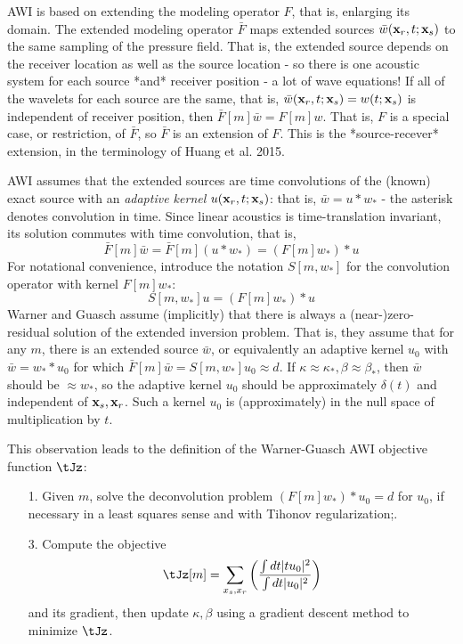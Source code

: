AWI is based on extending the modeling operator $F$, that is, enlarging its domain.
The extended modeling operator ${\bar F}$ maps extended sources $\bar{w}({\bf x}_r,t;{\bf x}_s)$ to the same sampling of the pressure field. That is, the extended source depends on the receiver location as well as the source location - so there is one acoustic system for each source *and* receiver position - a lot of wave equations! If all of the wavelets for each source are the same, that is, ${\bar w}({\bf x}_r,t;{\bf x}_s) = w(t;{\bf x}_s)$ is independent of receiver position, then ${\bar F}[m]\bar{w} = F[m]w$. That is, $F$ is a special case, or restriction, of ${\bar F}$, so ${\bar F}$ is an extension of $F$. This is the *source-recever* extension, in the terminology of Huang et al. 2015. 

AWI assumes that the extended sources are time convolutions of the (known) exact source with an {\em adaptive kernel} $u({\bf x}_r,t;{\bf x}_s)$: that is, $\bar{w} = u * w_*$ - the asterisk denotes convolution in time. Since linear acoustics is time-translation invariant, its solution commutes with time convolution, that is,
$$
\bar{F}[m]\bar{w} = \bar{F}[m](u* w_*) = (F[m]w_*)*u
$$
For notational convenience, introduce the notation $S[m,w_*]$ for the convolution operator with kernel $F[m]w_*$:
\begin{equation}
  \label{eqn:defs}
  S[m,w_*]u = (F[m]w_*)*u
\end{equation}
Warner and Guasch assume (implicitly) that there is always a (near-)zero-residual solution of the extended inversion problem. That is, they assume that for any $m$, there is an extended source $\bar{w}$, or equivalently an adaptive kernel $u_0$ with $\bar{w} = w_**u_0$ for which $\bar{F}[m]\bar{w} = S[m,w_*]u_0\approx d$. If $\kappa \approx \kappa_*, \beta \approx \beta_*$, then $\bar{w}$ should be $\approx w_*$, so the adaptive kernel $u_0$ should be approximately $\delta(t)$ and independent of ${\bf x}_s,{\bf x}_r$. Such a kernel $u_0$ is (approximately) in the null space of multiplication by $t$.

This observation leads to the definition of the Warner-Guasch AWI objective function $\tJz$:

\begin{itemize}
\item[1. ]Given $m$, solve the deconvolution problem $(F[m]w_*)*u_0 = d$ for $u_0$, if necessary in a least squares sense and with Tihonov regularization;. 
\item[3. ]Compute the objective 
  \begin{equation}
    \label{eqn:tJz}
    \tJz[m] = \sum_{x_s,x_r} \left(\frac{\int dt |tu_0|^2}{\int dt |u_0|^2}\right)
  \end{equation}
and its gradient, then update $\kappa,\beta$ using a gradient descent method to minimize $\tJz$.
\end{itemize}


